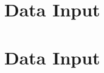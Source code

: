 \section[Input]{Data Input}
\makesubcontentsslides
\section{Data Input}
\makesubcontentsslides





